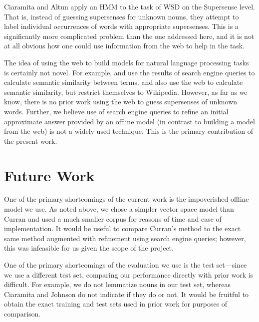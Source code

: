 \documentclass{article}
\begin{document}
Ciaramita and Altun \cite{ciaramita-altun} apply an HMM to the task of WSD on the Supersense level.
That is, instead of guessing supersenses for unknown nouns, they attempt to label individual occurrences of words with appropriate supersenses.
This is a significantly more complicated problem than the one addressed here, and it is not at all obvious how one could use information from the web to help in the task.


The idea of using the web to build models for natural language processing tasks is certainly not novel.
For example, \cite{bollegala} and \cite{gracia} use the results of search engine queries to calculate semantic similarity between terms.
\cite{strube} and \cite{gabrilovich} also use the web to calculate semantic similarity, but restrict themselves to Wikipedia.
However, as far as we know, there is no prior work using the web to guess supersenses of unknown words.
Further, we believe use of search engine queries to refine an initial approximate answer provided by an offline model (in contrast to building a model from the web) is not a widely used technique.
This is the primary contribution of the present work.

\section{Future Work}


One of the primary shortcomings of the current work is the impoverished offline model we use.
As noted above, we chose a simpler vector space model than Curran \cite{curran} and used a much smaller corpus for reasons of time and ease of implementation.
It would be useful to compare Curran's method to the exact same method augmented with refinement using search engine queries; however, this was infeasible for us given the scope of the project.

One of the primary shortcomings of the evaluation we use is the test set---since we use a different test set, comparing our performance directly with prior work is difficult.
For example, we do not lemmatize nouns in our test set, whereas Ciaramita and Johnson \cite{cj} do not indicate if they do or not.
It would be fruitful to obtain the exact training and test sets used in prior work for purposes of comparison.
\end{document}
